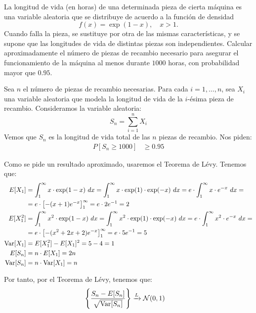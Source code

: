 \begin{ejercicio}
    La longitud de vida (en horas) de una determinada pieza de cierta máquina es una variable aleatoria que se distribuye de acuerdo a la función de densidad
    \[
        f (x) = \exp(1 - x), \quad x > 1.
    \]
    Cuando falla la pieza, se sustituye por otra de las mismas características, y se supone que las longitudes de vida de distintas piezas son independientes. Calcular aproximadamente el número de piezas de recambio necesario para asegurar el funcionamiento de la máquina al menos durante $1000$ horas, con probabilidad mayor que $0.95$.

    Sea $n$ el número de piezas de recambio necesarias. Para cada $i=1, \ldots, n$, sea $X_i$ una variable aleatoria que modela la longitud de vida de la $i$-ésima pieza de recambio. Consideramos la variable aleatoria:
    \[
        S_{n} = \sum_{i=1}^{n} X_i
    \]
    Vemos que $S_{n}$ es la longitud de vida total de las $n$ piezas de recambio. Nos piden:
    \begin{align*}
        P[S_{n} \geq 1000] &\geq 0.95
    \end{align*}

    Como se pide un resultado aproximado, usaremos el Teorema de Lévy. Tenemos que:
    \begin{align*}
        E[X_1] &= \int_{1}^{\infty} x \cdot \exp(1-x) \ dx = \int_{1}^{\infty} x \cdot \exp(1) \cdot \exp(-x) \ dx = e\cdot \int_{1}^{\infty} x \cdot e^{-x} \ dx
        =\\&= e\cdot \left[-(x+1)e^{-x}\right]_1^\infty
        = e\cdot 2e^{-1} = 2\\
        E[X_1^2] &= \int_{1}^{\infty} x^2 \cdot \exp(1-x) \ dx = \int_{1}^{\infty} x^2 \cdot \exp(1) \cdot \exp(-x) \ dx = e\cdot \int_{1}^{\infty} x^2 \cdot e^{-x} \ dx
        =\\&= e\cdot \left[-(x^2+2x+2)e^{-x}\right]_1^\infty
        = e\cdot 5e^{-1} = 5\\
        \operatorname{Var}[X_1] &= E[X_1^2] - E[X_1]^2 = 5 - 4 = 1\\
        E[S_{n}] &= n \cdot E[X_1] = 2n\\
        \operatorname{Var}[S_{n}] &= n \cdot \operatorname{Var}[X_1] = n
    \end{align*}

    Por tanto, por el Teorema de Lévy, tenemos que:
    \begin{align*}
        \left\{\frac{S_{n}-E[S_n]}{\sqrt{\operatorname{Var}[S_{n}]}}\right\} &\xrightarrow{L} \mathcal{N}(0,1)
    \end{align*}


\end{ejercicio}
